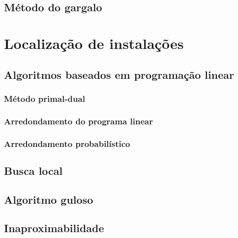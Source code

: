 \documentclass[12pt]{article}
\begin{document}
\subsection{Método do gargalo}
    

\section{Localização de instalações}
    

\subsection{Algoritmos baseados em programação linear}
    

\subsubsection{Método primal-dual}
    

\subsubsection{Arredondamento do programa linear}
    

\subsubsection{Arredondamento probabilístico}
    

\subsection{Busca local}
    

\subsection{Algoritmo guloso}
    

\subsection{Inaproximabilidade}
    
\newpage


\end{document}

